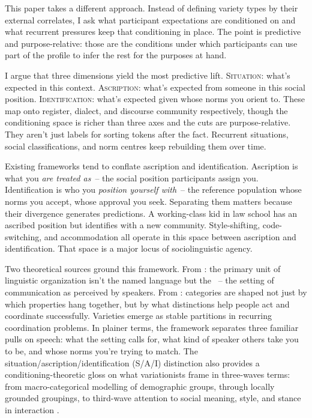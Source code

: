 \documentclass[11pt,letterpaper]{article}
\begin{document}
This paper takes a different approach. Instead of defining variety types by their external correlates, I ask what participant expectations are conditioned on and what recurrent pressures keep that conditioning in place. The point is predictive and purpose-relative: those are the conditions under which participants can use part of the profile to infer the rest for the purposes at hand.

I argue that three dimensions yield the most predictive lift. \textsc{Situation}: what's expected in this context. \textsc{Ascription}: what's expected from someone in this social position. \textsc{Identification}: what's expected given whose norms you orient to. These map onto register, dialect, and discourse community respectively, though the conditioning space is richer than three axes and the cuts are purpose-relative. They aren't just labels for sorting tokens after the fact. Recurrent situations, social classifications, and norm centres keep rebuilding them over time.

Existing frameworks tend to conflate ascription and identification. Ascription is what you \emph{are treated as}~-- the social position participants assign you. Identification is who you \emph{position yourself with}~-- the reference population whose norms you accept, whose approval you seek. Separating them matters because their divergence generates predictions. A working-class kid in law school has an ascribed position but identifies with a new community. Style-shifting, code-switching, and accommodation all operate in this space between ascription and identification. That space is a major locus of sociolinguistic agency.

Two theoretical sources ground this framework. From \textcite{wiese2023}: the primary unit of linguistic organization isn't the named language but the ~-- the setting of communication as perceived by speakers. From \textcite{oconnor2019games}: categories are shaped not just by which properties hang together, but by what distinctions help people act and coordinate successfully. Varieties emerge as stable partitions in recurring coordination problems. In plainer terms, the framework separates three familiar pulls on speech: what the setting calls for, what kind of speaker others take you to be, and whose norms you're trying to match. The situation/ascription/identification (S/A/I) distinction also provides a conditioning-theoretic gloss on what variationists frame in three-waves terms: from macro-categorical modelling of demographic groups, through locally grounded groupings, to third-wave attention to social meaning, style, and stance in interaction \citep[50--55]{drummond_schleef2016_identity}.
\end{document}

